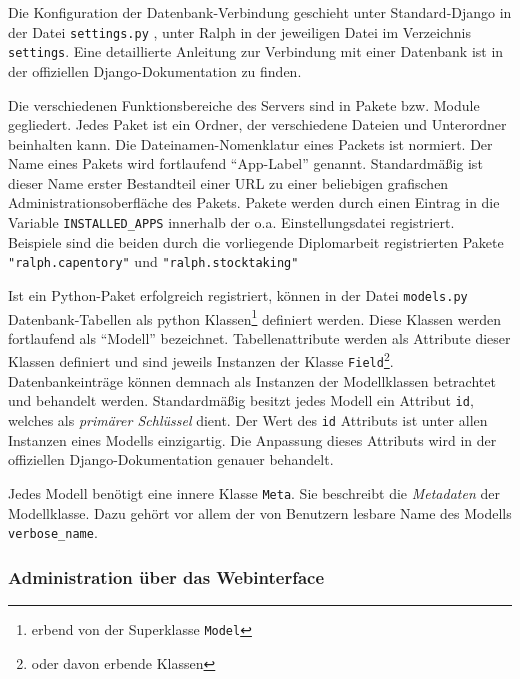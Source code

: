 Die Konfiguration der Datenbank-Verbindung geschieht unter
Standard-Django in der Datei \texttt{settings.py} , unter Ralph in der
jeweiligen Datei im Verzeichnis \texttt{settings}. Eine detaillierte
Anleitung zur Verbindung mit einer Datenbank ist in der offiziellen
Django-Dokumentation \cite{django-doku-db} zu finden.

Die verschiedenen Funktionsbereiche des Servers sind in Pakete bzw.
Module gegliedert. Jedes Paket ist ein Ordner, der verschiedene Dateien
und Unterordner beinhalten kann. Die Dateinamen-Nomenklatur eines
Packets ist normiert.\cite{django-file-nomenklatur} Der Name eines
Pakets wird fortlaufend ``App-Label'' genannt. Standardmäßig ist dieser
Name erster Bestandteil einer URL zu einer beliebigen grafischen
Administrationsoberfläche des Pakets. Pakete werden durch einen Eintrag
in die Variable \texttt{INSTALLED\_APPS} innerhalb der o.a.
Einstellungsdatei registriert. Beispiele sind die beiden durch die
vorliegende Diplomarbeit registrierten Pakete \texttt{"ralph.capentory"}
und \texttt{"ralph.stocktaking"}

Ist ein Python-Paket erfolgreich registriert, können in der Datei
\texttt{models.py} Datenbank-Tabellen als python Klassen\footnote{erbend
  von der Superklasse \texttt{Model}\cite{django-doku-models}} definiert
werden. Diese Klassen werden fortlaufend als ``Modell'' bezeichnet.
Tabellenattribute werden als Attribute dieser Klassen definiert und sind
jeweils Instanzen der Klasse
\texttt{Field}\cite{django-doku-models}\footnote{oder davon erbende
  Klassen}. Datenbankeinträge können demnach als Instanzen der
Modellklassen betrachtet und behandelt werden. Standardmäßig besitzt
jedes Modell ein Attribut \texttt{id}, welches als
\emph{primärer Schlüssel}
dient. Der Wert des \texttt{id} Attributs ist unter allen Instanzen
eines Modells einzigartig. Die Anpassung dieses Attributs wird in der
offiziellen Django-Dokumentation genauer behandelt.
\cite{django-doku-models}

Jedes Modell benötigt eine innere Klasse \texttt{Meta}. Sie beschreibt
die
\emph{Metadaten}
der Modellklasse. Dazu gehört vor allem der von Benutzern lesbare Name
des Modells \texttt{verbose\_name}. \cite{django-doku-models-options}

\hypertarget{administration-uxfcber-das-webinterface}{%
\subsubsection{Administration über das
Webinterface}\label{administration-uxfcber-das-webinterface}}

